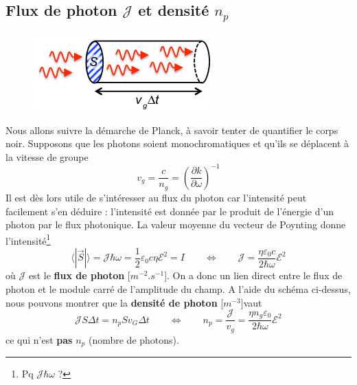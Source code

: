 	\subsection{Flux de photon $\mathcal{J}$ et densité $n_p$}
		\begin{figure}
	\vspace{-5mm}
	\includegraphics[scale=0.7]{ch2/image7.png}
	\end{figure}
	Nous allons suivre la démarche de Planck, à savoir tenter de quantifier le corps noir. Supposons que les 
	photons soient monochromatiques et qu'ils se déplacent à la vitesse de groupe
	\begin{equation}
	v_g = \frac{c}{n_g} = \left(\dfrac{\partial k}{\partial\omega}\right)^{-1}
	\end{equation}
	Il est dès lors utile de s'intéresser au flux du photon car l'intensité peut facilement s'en déduire : 
	l'intensité est donnée par le produit de l'énergie d'un photon par le flux photonique. La valeur moyenne
	du vecteur de Poynting donne l'intensité\footnote{Pq $\mathcal{J}\hbar\omega$ ?}
	\begin{equation}
	\langle |\vec{S}|\rangle = \mathcal{J}\hbar\omega = \frac{1}{2}\varepsilon_0c\eta\mathcal{E}^2 = I\qquad
	\Leftrightarrow\qquad \mathcal{J} = \dfrac{\eta\varepsilon_0c}{2\hbar\omega}\mathcal{E}^2
	\end{equation}
	où $\mathcal{J}$ est le \textbf{flux de photon} [$m^{-2}.s^{-1}$]. On a donc un lien direct entre le flux 
	de photon et le module carré de l'amplitude du champ. A l'aide du schéma ci-dessus, nous pouvons montrer 
	que la \textbf{densité de photon} [$m^{-3}$]vaut 
	\begin{equation}
	\mathcal{J}S\Delta t = n_pSv_G\Delta t\qquad\Leftrightarrow\qquad n_p = \dfrac{\mathcal{J}}{v_g}=
	\dfrac{\eta n_g\varepsilon_0}{2\hbar\omega}\mathcal{E}^2
	\end{equation}
	ce qui n'est \textbf{pas} $n_p$ (nombre de photons).
	
